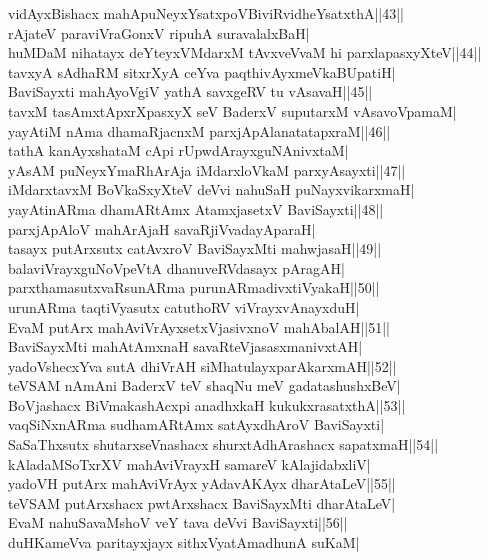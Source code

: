 \documentclass{article}
\begin{document}
vidAyxBishacx mahApuNeyxYsatxpoVBiviRvidheYsatxthA||43||\\
rAjateV paraviVraGonxV ripuhA suravalalxBaH|\\
huMDaM nihatayx deYteyxVMdarxM tAvxveVvaM hi parxlapasxyXteV||44||\\
tavxyA sAdhaRM sitxrXyA ceYva paqthivAyxmeVkaBUpatiH|\\
BaviSayxti mahAyoVgiV yathA savxgeRV tu vAsavaH||45||\\
tavxM tasAmxtApxrXpasxyX seV BaderxV suputarxM vAsavoVpamaM|\\
yayAtiM nAma dhamaRjacnxM parxjApAlanatatapxraM||46||\\
tathA kanAyxshataM cApi rUpwdArayxguNAnivxtaM|\\
yAsAM puNeyxYmaRhArAja iMdarxloVkaM parxyAsayxti||47||\\
iMdarxtavxM BoVkaSxyXteV deVvi nahuSaH puNayxvikarxmaH|\\
yayAtinARma dhamARtAmx AtamxjasetxV BaviSayxti||48||\\
parxjApAloV mahArAjaH savaRjiVvadayAparaH|\\
tasayx putArxsutx catAvxroV BaviSayxMti mahwjasaH||49||\\
balaviVrayxguNoVpeVtA dhanuveRVdasayx pAragAH|\\
parxthamasutxvaRsunARma purunARmadivxtiVyakaH||50||\\
urunARma taqtiVyasutx catuthoRV viVrayxvAnayxduH|\\
EvaM putArx mahAviVrAyxsetxVjasivxnoV mahAbalAH||51||\\
BaviSayxMti mahAtAmxnaH savaRteVjasasxmanivxtAH|\\
yadoVshecxYva sutA dhiVrAH siMhatulayxparAkarxmAH||52||\\
teVSAM nAmAni BaderxV teV shaqNu meV gadatashushxBeV|\\
BoVjashacx BiVmakashAcxpi anadhxkaH kukukxrasatxthA||53||\\
vaqSiNxnARma sudhamARtAmx satAyxdhAroV BaviSayxti|\\
SaSaThxsutx shutarxseVnashacx shurxtAdhArashacx sapatxmaH||54||\\
kAladaMSoTxrXV mahAviVrayxH samareV kAlajidabxliV|\\
yadoVH putArx mahAviVrAyx yAdavAKAyx dharAtaLeV||55||\\
teVSAM putArxshacx pwtArxshacx BaviSayxMti dharAtaLeV|\\
EvaM nahuSavaMshoV veY tava deVvi BaviSayxti||56||\\
duHKameVva paritayxjayx sithxVyatAmadhunA suKaM|\\
\end{document}
